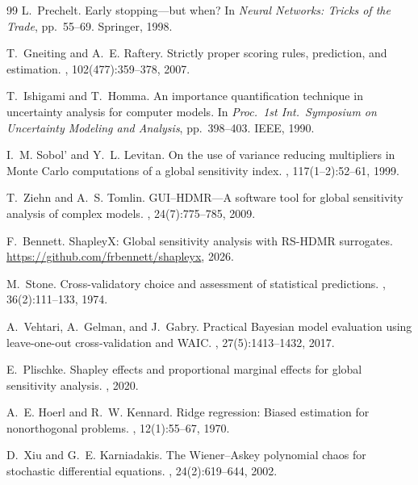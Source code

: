 \documentclass[11pt,a4paper]{article}
\begin{document}
\begin{thebibliography}{99}
L.~Prechelt.
\newblock Early stopping---but when?
\newblock In {\em Neural Networks: Tricks of the Trade}, pp.\ 55--69. Springer, 1998.

T.~Gneiting and A.~E. Raftery.
\newblock Strictly proper scoring rules, prediction, and estimation.
, 102(477):359--378, 2007.

T.~Ishigami and T.~Homma.
\newblock An importance quantification technique in uncertainty analysis for computer models.
\newblock In {\em Proc.\ 1st Int.\ Symposium on Uncertainty Modeling and Analysis}, pp.\ 398--403. IEEE, 1990.

I.~M. Sobol' and Y.~L. Levitan.
\newblock On the use of variance reducing multipliers in Monte Carlo computations of a global sensitivity index.
, 117(1--2):52--61, 1999.

T.~Ziehn and A.~S. Tomlin.
\newblock GUI--HDMR---A software tool for global sensitivity analysis of complex models.
, 24(7):775--785, 2009.

F.~Bennett.
\newblock ShapleyX: Global sensitivity analysis with RS-HDMR surrogates.
\newblock \url{https://github.com/frbennett/shapleyx}, 2026.

M.~Stone.
\newblock Cross-validatory choice and assessment of statistical predictions.
, 36(2):111--133, 1974.

A.~Vehtari, A.~Gelman, and J.~Gabry.
\newblock Practical Bayesian model evaluation using leave-one-out cross-validation and WAIC.
, 27(5):1413--1432, 2017.

E.~Plischke.
\newblock Shapley effects and proportional marginal effects for global sensitivity analysis.
, 2020.

A.~E. Hoerl and R.~W. Kennard.
\newblock Ridge regression: Biased estimation for nonorthogonal problems.
, 12(1):55--67, 1970.

D.~Xiu and G.~E. Karniadakis.
\newblock The Wiener--Askey polynomial chaos for stochastic differential equations.
, 24(2):619--644, 2002.

\end{thebibliography}
\end{document}
